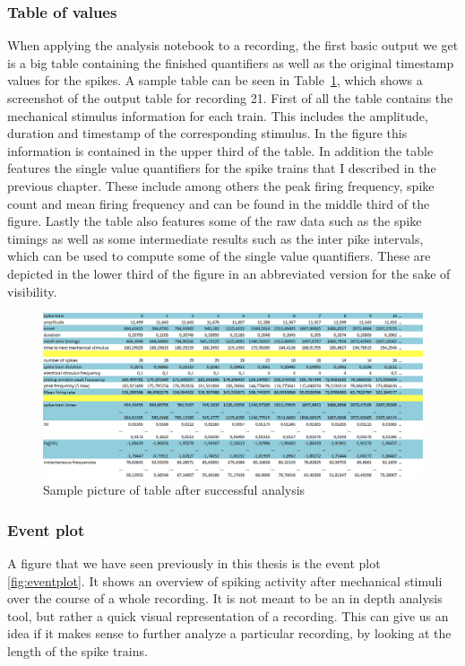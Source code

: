 \subsubsection{Table of values}
When applying the analysis notebook to a recording, the first basic output we get is a big table containing the finished quantifiers as well as the original timestamp values for the spikes. A sample table can be seen in Table~\ref{fig:table_sc}, which shows a screenshot of the output table for recording 21.
First of all the table contains the mechanical stimulus information for each train. This includes the amplitude, duration and timestamp of the corresponding stimulus. In the figure this information is contained in the upper third of the table.
In addition the table features the single value quantifiers for the spike trains that I described in the previous chapter. These include among others the peak firing frequency, spike count and mean firing frequency and can be found in the middle third of the figure.
Lastly the table also features some of the raw data such as the spike timings as well as some intermediate results such as the inter pike intervals, which can be used to compute some of the single value quantifiers. These are depicted in the lower third of the figure in an abbreviated version for the sake of visibility.\\
\begin{figure}
	\includegraphics[width = \textwidth]{src/pic/sc_table}
	\caption{Sample picture of table after successful analysis }
	\label{fig:table_sc}
\end{figure}

\subsubsection{Event plot}
A figure that we have seen previously in this thesis is the event plot \ref{fig:eventplot}. It shows an overview of spiking activity after mechanical stimuli over the course of a whole recording. It is not meant to be an in depth analysis tool, but rather a quick visual representation of a recording. This can give us an idea if it makes sense to further analyze a particular recording, by looking at the length of the spike trains.

